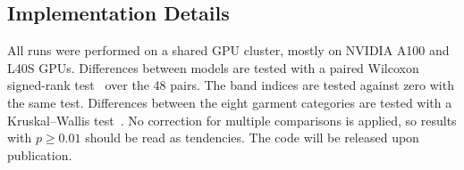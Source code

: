 \subsection{Implementation Details}
All runs were performed on a shared GPU cluster, mostly on NVIDIA A100 and L40S GPUs. Differences between models are tested with a paired Wilcoxon signed-rank test~\cite{wilcoxon1945} over the 48 pairs. The band indices are tested against zero with the same test. Differences between the eight garment categories are tested with a Kruskal–Wallis test~\cite{kruskal1952use}. No correction for multiple comparisons is applied, so results with $p \geq 0.01$ should be read as tendencies. The code will be released upon publication.
